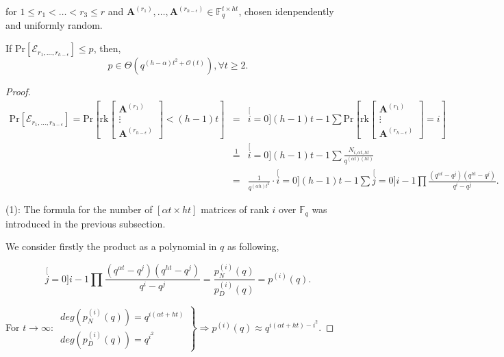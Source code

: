 for $1\leq r_{1}<\ldots<r_{3}\leq r$ and $\boldsymbol{A}^{\left(r_{1}\right)},\ldots,\boldsymbol{A}^{\left(r_{h-\epsilon}\right)}\in\ensuremath{\mathbb{F}}_{q}^{t\times ht}$,
chosen idenpendently and uniformly random.
\begin{lem}
If $\mathrm{Pr}\left[\mathcal{E}_{r_{1},\ldots,r_{h-\epsilon}}\right]\leq p$,
then,
\[
p\in\Theta\left(q^{\left(h-\alpha\right)t^{2}+\mathcal{O}(t)}\right),\forall t\geq2.
\]
\end{lem}
\begin{proof}
\begin{eqnarray}
\mathrm{Pr}\left[\mathcal{E}_{r_{1},\ldots,r_{h-\epsilon}}\right]=\mathrm{Pr}\left[\mathrm{rk}\left[\begin{array}{c}
\boldsymbol{A}^{\left(r_{1}\right)}\\
\vdots\\
\boldsymbol{A}^{\left(r_{h-\epsilon}\right)}
\end{array}\right]<(h-1)t\right] & = & \stackrel[i=0]{(h-1)t-1}{\mathop{\sum}}\mathrm{Pr}\left[\mathrm{rk}\left[\begin{array}{c}
\boldsymbol{A}^{\left(r_{1}\right)}\\
\vdots\\
\boldsymbol{A}^{\left(r_{h-\epsilon}\right)}
\end{array}\right]=i\right]\nonumber \\
 & \overset{1}{=} & \stackrel[i=0]{(h-1)t-1}{\mathop{\sum}}\frac{N_{i,\alpha t,ht}}{q^{\left(\alpha t\right)\left(ht\right)}}\nonumber \\
 & = & \frac{1}{q^{\left(\alpha h\right)t^{2}}}\cdot\stackrel[i=0]{(h-1)t-1}{\mathop{\sum}}\stackrel[j=0]{i-1}{\mathop{\prod}}\frac{\left(q^{\alpha t}-q^{j}\right)\left(q^{ht}-q^{j}\right)}{q^{i}-q^{j}}.\label{eq:general_nw_calc_p}
\end{eqnarray}

(1): The formula for the number of $\left[\alpha t\times ht\right]$
matrices of rank $i$ over $\ensuremath{\mathbb{F}}_{q}$ was introduced
in the previous subsection.

We consider firstly the product as a polynomial in $q$ as following,

\[
\stackrel[j=0]{i-1}{\mathop{\prod}}\frac{\left(q^{\alpha t}-q^{j}\right)\left(q^{ht}-q^{j}\right)}{q^{i}-q^{j}}=\frac{p_{N}^{(i)}(q)}{p_{D}^{(i)}(q)}=p^{(i)}(q).
\]

For $t\rightarrow\infty$: $\left.\begin{array}{c}
deg\left(p_{N}^{(i)}(q)\right)=q^{i(\alpha t+ht)}\\
deg\left(p_{D}^{(i)}(q)\right)=q^{i^{2}}
\end{array}\right\} \Rightarrow p^{(i)}(q)\approx q^{i(\alpha t+ht)-i^{2}}.$


\end{proof}
